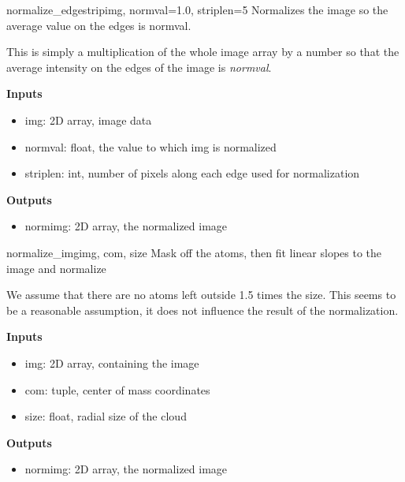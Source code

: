 \documentclass[letterpaper,10pt,english]{manual}
\begin{document}
\hypertarget{odysseus.imageprocess.normalize_edgestrip}{}\begin{funcdesc}{normalize\_edgestrip}{img, normval=1.0, striplen=5}
Normalizes the image so the average value on the edges is normval.

This is simply a multiplication of the whole image array by a number
so that the average intensity on the edges of the image is \emph{normval}.

\textbf{Inputs}
\begin{itemize}
\item {} 
img: 2D array, image data

\item {} 
normval: float, the value to which img is normalized

\item {} 
striplen: int, number of pixels along each edge used for normalization

\end{itemize}

\textbf{Outputs}
\begin{itemize}
\item {} 
normimg: 2D array, the normalized image

\end{itemize}
\end{funcdesc}

\hypertarget{odysseus.imageprocess.normalize_img}{}\begin{funcdesc}{normalize\_img}{img, com, size}
Mask off the atoms, then fit linear slopes to the image and normalize

We assume that there are no atoms left outside 1.5 times the size. This
seems to be a reasonable assumption, it does not influence the result of
the normalization.

\textbf{Inputs}
\begin{itemize}
\item {} 
img: 2D array, containing the image

\item {} 
com: tuple, center of mass coordinates

\item {} 
size: float, radial size of the cloud

\end{itemize}

\textbf{Outputs}
\begin{itemize}
\item {} 
normimg: 2D array, the normalized image

\end{itemize}
\end{funcdesc}
\end{document}
